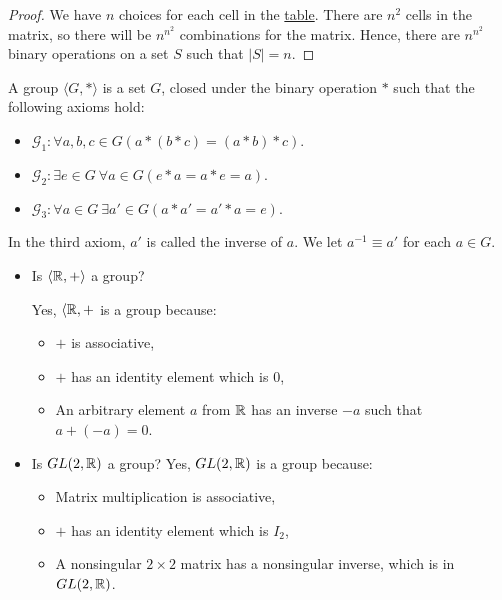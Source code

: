     \begin{proof}
        We have \(n\) choices for each cell in the \hyperref[exm:caytab]{table}. There are \(n^2\) cells in the matrix, so there will be \(n^{n^2}\) combinations for the matrix. Hence, there are \(n^{n^2}\) binary operations on a set \(S\) such that \(|S| = n\).
    \end{proof}

    \begin{dfn}[Group]
        A group \(\langle G, *\rangle\) is a set \(G\), closed under the binary operation \(*\) such that the following axioms hold:
        \begin{itemize}
            \item \(\mathcal{G}_1\!: \forall a,b,c\!\in\! G (a * (b * c) = (a * b) * c)\).
            \item \(\mathcal{G}_2\!: \exists e\!\in\! G\ \forall a\!\in\! G (e * a = a * e = a)\).
            \item \(\mathcal{G}_3\!: \forall a\!\in\! G\ \exists a'\!\in\! G (a * a' = a' * a = e)\).
        \end{itemize}

        In the third axiom, \(a'\) is called the inverse of \(a\). We let \(a^{-1} \equiv a'\) for each \(a\in G\).
    \end{dfn}

    \begin{example}
        \mbox{}

        \begin{itemize}
            \item Is \(\langle \mathbb{R}, +\rangle\) a group?

            Yes, \(\langle \mathbb{R}, +\) is a group because:
            \begin{itemize}
                \item \(+\) is associative,
                \item \(+\) has an identity element which is \(0\),
                \item An arbitrary element \(a\) from \(\mathbb{R}\) has an inverse \(-a\) such that \(a + (-a) = 0\).
            \end{itemize}

            \item Is \(GL(2, \mathbb{R})\) a group?
            Yes, \(GL(2, \mathbb{R})\) is a group because:
            \begin{itemize}
                \item Matrix multiplication is associative,
                \item \(+\) has an identity element which is \(I_2\),
                \item A nonsingular \(2 \times 2\) matrix has a nonsingular inverse, which is in \(GL(2, \mathbb{R})\).
            \end{itemize}
        \end{itemize}
    \end{example}
